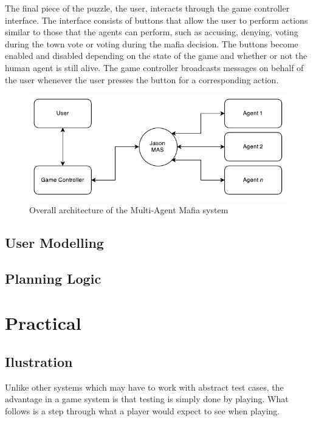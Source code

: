 \documentclass[12pt]{article} %
\begin{document}
The final piece of the puzzle, the user, interacts through the game controller interface. The interface consists of buttons that allow the user to perform actions similar to those that the agents can perform, such as accusing, denying, voting during the town vote or voting during the mafia decision. The buttons become enabled and disabled depending on the state of the game and whether or not the human agent is still alive. The game controller broadcasts messages on behalf of the user whenever the user presses the button for a corresponding action.

\begin{figure}
	\centering
	\includegraphics[width=\linewidth]{Overall.pdf}
	\caption{Overall architecture of the Multi-Agent Mafia system}
	\label{fig:overallarch}
\end{figure}

\subsection{User Modelling}

\subsection{Planning Logic}


\section{Practical}

\subsection{Ilustration}

Unlike other systems which may have to work with abstract test cases, the advantage in a game system is that testing is simply done by playing. What follows is a step through what a player would expect to see when playing. 
\end{document}
